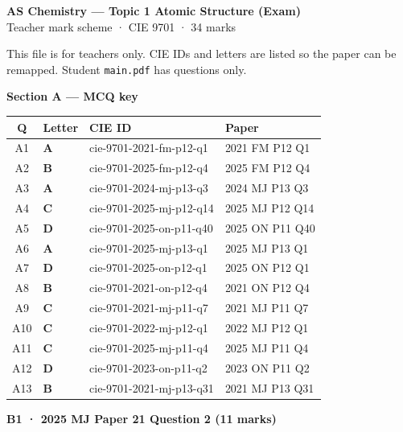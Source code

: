 \documentclass[10pt,a4paper]{article}
\begin{document}
\begin{center}
{\large\bfseries AS Chemistry --- Topic 1 Atomic Structure (Exam)}\\[0.15em]
{\small Teacher mark scheme · CIE 9701 · 34 marks}
\end{center}

{\small This file is for teachers only. CIE IDs and letters are listed so the paper can be remapped. Student \texttt{main.pdf} has questions only.}

\vspace{0.2em}
{\normalsize\bfseries Section A --- MCQ key}

\vspace{0.1em}
{\small
\begin{tabular}{@{}clll@{}}
\toprule
\textbf{Q} & \textbf{Letter} & \textbf{CIE ID} & \textbf{Paper} \\
\midrule
A1 & \textbf{A} & cie-9701-2021-fm-p12-q1 & 2021 FM P12 Q1 \\
A2 & \textbf{B} & cie-9701-2025-fm-p12-q4 & 2025 FM P12 Q4 \\
A3 & \textbf{A} & cie-9701-2024-mj-p13-q3 & 2024 MJ P13 Q3 \\
A4 & \textbf{C} & cie-9701-2025-mj-p12-q14 & 2025 MJ P12 Q14 \\
A5 & \textbf{D} & cie-9701-2025-on-p11-q40 & 2025 ON P11 Q40 \\
A6 & \textbf{A} & cie-9701-2025-mj-p13-q1 & 2025 MJ P13 Q1 \\
A7 & \textbf{D} & cie-9701-2025-on-p12-q1 & 2025 ON P12 Q1 \\
A8 & \textbf{B} & cie-9701-2021-on-p12-q4 & 2021 ON P12 Q4 \\
A9 & \textbf{C} & cie-9701-2021-mj-p11-q7 & 2021 MJ P11 Q7 \\
A10 & \textbf{C} & cie-9701-2022-mj-p12-q1 & 2022 MJ P12 Q1 \\
A11 & \textbf{C} & cie-9701-2025-mj-p11-q4 & 2025 MJ P11 Q4 \\
A12 & \textbf{D} & cie-9701-2023-on-p11-q2 & 2023 ON P11 Q2 \\
A13 & \textbf{B} & cie-9701-2021-mj-p13-q31 & 2021 MJ P13 Q31 \\
\bottomrule
\end{tabular}}

\vspace{0.35em}
{\normalsize\bfseries B1 · 2025 MJ Paper 21 Question 2 (11 marks)}
\end{document}
